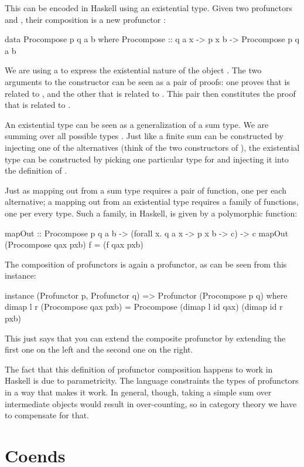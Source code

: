 \documentclass[DaoFP]{subfiles}
\begin{document}
This can be encoded in Haskell using an existential type. Given two profunctors  and , their composition is a new profunctor :
\begin{haskell}
data Procompose p q a b where
  Procompose ::  q a x -> p x b -> Procompose p q a b
\end{haskell}
We are using a  to express the existential nature of the object . The two arguments to the constructor can be seen as a pair of proofs: one proves that  is related to , and the other that  is related to . This pair then constitutes the proof that  is related to .

An existential type can be seen as a generalization of a sum type. We are summing over all possible types . Just like a finite sum can be constructed by injecting one of the alternatives (think of the two constructors of ), the existential type can be constructed by picking one particular type for  and injecting it into the definition of . 

Just as mapping out from a sum type requires a pair of function, one per each alternative; a mapping out from an existential type requires a family of functions, one per every type. Such a family, in Haskell, is given by a polymorphic function:
\begin{haskell}
mapOut :: Procompose p q a b -> (forall x. q a x -> p x b -> c) -> c
mapOut (Procompose qax pxb) f = (f qax pxb)
\end{haskell}

The composition of profunctors is again a profunctor, as can be seen from this instance:
\begin{haskell}
instance (Profunctor p, Profunctor q) => Profunctor (Procompose p q) 
  where
    dimap l r (Procompose qax pxb) = 
               Procompose (dimap l id qax) (dimap id r pxb)
\end{haskell}
This just says that you can extend the composite profunctor by extending the first one on the left and the second one on the right.

The fact that this definition of profunctor composition happens to work in Haskell is due to parametricity. The language constraints the types of profunctors in a way that makes it work. In general, though, taking a simple sum over intermediate objects would result in over-counting, so in category theory we have to compensate for that.

\section{Coends}
\end{document}
